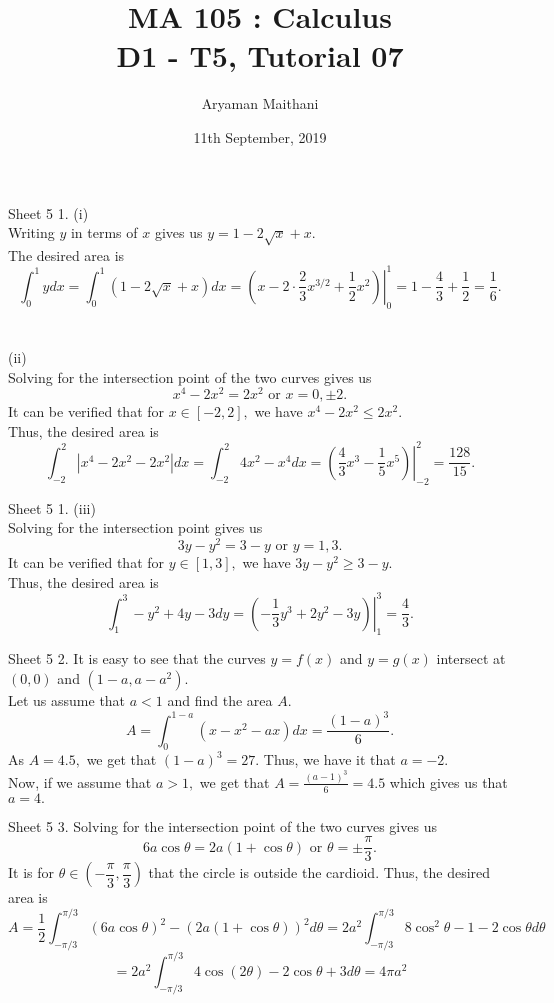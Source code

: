 \documentclass[handout, aspectratio=169]{beamer}
\title{MA 105 : Calculus\\ D1 - T5, Tutorial 07}  %
\author{Aryaman Maithani}
\date[11-09-2019]{11th September, 2019}               %
\institute[IITB]{IIT Bombay}
\begin{document}
\begin{frame}
	\titlepage
\end{frame}
\begin{frame}{Sheet 5}                            %
	1. (i)\\
	Writing $y$ in terms of $x$ gives us $y = 1 - 2\sqrt{x} + x.$\\
	The desired area is $$\displaystyle\int_{0}^{1} y dx = \int_{0}^{1} (1 - 2\sqrt{x} + x) dx = \left.\left(x - 2\cdot\frac{2}{3}x^{3/2} + \frac{1}{2}x^2\right)\right|_{0}^{1} = 1 - \frac{4}{3} + \dfrac{1}{2} = \frac{1}{6}. $$\\~\\
	(ii)\\
	Solving for the intersection point of the two curves gives us
	\[x^4 - 2x^2 = 2x^2 \text{ or } x = 0, \pm 2.\]
	It can be verified that for $x \in [-2, 2],$ we have $x^4 - 2x^2 \le 2x^2.$\\
	Thus, the desired area is
	\[\int_{-2}^{2} |x^4 - 2x^2 - 2x^2| dx = \int_{-2}^{2} 4x^2 - x^4 dx = \left.\left(\frac{4}{3}x^3 - \frac{1}{5}x^5\right)\right|_{-2}^{2} = \frac{128}{15}.\]
	
\end{frame}
\begin{frame}{Sheet 5}
	1. (iii)\\
	Solving for the intersection point gives us
	\[3y - y^2 = 3 - y \text{ or } y = 1, 3.\]
	It can be verified that for $y \in [1, 3],$ we have $3y - y^2 \ge 3 - y.$\\
	Thus, the desired area is
	\[\int_{1}^{3} -y^2 + 4y - 3 dy = \left.\left(-\frac{1}{3}y^3 + 2y^2 - 3y\right)\right|_1^3 = \frac{4}{3}. \]
\end{frame}
\begin{frame}{Sheet 5}
	2. It is easy to see that the curves $y = f(x)$ and $y = g(x)$ intersect at $(0, 0)$ and $(1-a, a-a^2).$\\
	Let us assume that $a < 1$ and find the area $A.$
	\[A = \int_{0}^{1-a} (x - x^2 - ax) dx = \frac{(1-a)^3}{6}.\]
	As $A = 4.5,$ we get that $(1 - a)^3 = 27.$ Thus, we have it that $a = -2.$\\
	Now, if we assume that $a > 1,$ we get that $A = \frac{(a-1)^3}{6} = 4.5$ which gives us that $a = 4.$
\end{frame}
\begin{frame}{Sheet 5}
	3. Solving for the intersection point of the two curves gives us
	\[6a\cos\theta = 2a(1+\cos\theta) \text{ or } \theta = \pm\frac{\pi}{3}.\]
	It is for $\theta \in \left(-\dfrac{\pi}{3}, \dfrac{\pi}{3}\right)$ that the circle is outside the cardioid. Thus, the desired area is
	\[A = \frac{1}{2}\int_{-\pi/3}^{\pi/3} (6a\cos\theta)^2 - (2a(1 + \cos\theta))^2 d\theta = 2a^2\int_{-\pi/3}^{\pi/3} 8\cos^2\theta - 1 - 2\cos\theta d\theta\]
	\[= 2a^2\int_{-\pi/3}^{\pi/3} 4\cos(2\theta) - 2\cos\theta + 3 d\theta = 4\pi a^2 \]
\end{frame}
\end{document}
